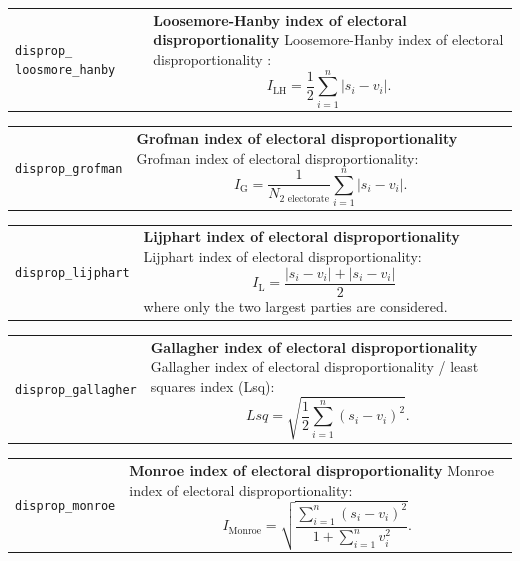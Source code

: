 \documentclass[
  a4paper,
  DIV=11,
  numbers=noendperiod]{scrartcl}
\begin{document}
\begin{longtable*}{p{3.2cm}| p{11cm}}
\texttt{disprop\_
loosmore\_hanby} &\textbf{Loosemore-Hanby index of electoral disproportionality}\newline 
Loosemore-Hanby index of electoral disproportionality \parencite{loosemoreTheoreticalLimitsMaximum1971}:
           \begin{equation}I_{\text{LH}} = \frac{1}{2}\sum_{i = 1}^{n}|s_i - v_i|.\end{equation}
\end{longtable*}

\begin{longtable*}{p{3.2cm}| p{11cm}}
\texttt{disprop\_grofman} &\textbf{Grofman index of electoral disproportionality}\newline 
Grofman index of electoral disproportionality:
           \begin{equation}I_{\text{G}} = \frac{1}{N_{2\text{ electorate}}}\sum_{i=1}^{n}|s_i - v_i|.\end{equation}
\end{longtable*}

\begin{longtable*}{p{3.2cm}| p{11cm}}
\texttt{disprop\_lijphart} &\textbf{Lijphart index of electoral disproportionality}\newline 
Lijphart index of electoral disproportionality:
           \begin{equation}I_{\text{L}} = \frac{|s_i - v_i| + |s_i - v_i|}{2}\end{equation}
           where only the two largest parties are considered.
\end{longtable*}

\begin{longtable*}{p{3.2cm}| p{11cm}}
\texttt{disprop\_gallagher} &\textbf{Gallagher index of electoral disproportionality}\newline 
Gallagher index of electoral disproportionality / least squares index (Lsq):
          \begin{equation}Lsq = \sqrt{\frac{1}{2}\sum_{i = 1}^{n}\left(s_i - v_i\right)^2}.\end{equation}
\end{longtable*}

\begin{longtable*}{p{3.2cm}| p{11cm}}
\texttt{disprop\_monroe} &\textbf{Monroe index of electoral disproportionality}\newline 
Monroe index of electoral disproportionality:
           \begin{equation}I_{\text{Monroe}} = \sqrt{\frac{\sum_{i=1}^{n}\left(s_i - v_i\right)^2}{1 + \sum_{i=1}^{n}v_i^2}}.\end{equation}
\end{longtable*}
\end{document}
